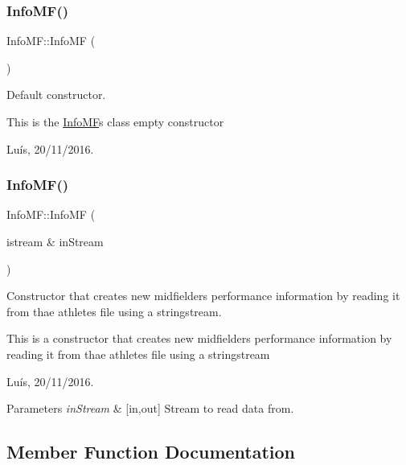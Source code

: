 \subsubsection{\texorpdfstring{Info\+M\+F()}{InfoMF()}\hspace{0.1cm}{\footnotesize\ttfamily [3/4]}}
{\footnotesize\ttfamily Info\+M\+F\+::\+Info\+MF (\begin{DoxyParamCaption}{ }\end{DoxyParamCaption})}



Default constructor. 

This is the \hyperlink{class_info_m_f}{Info\+MF}\textquotesingle{}s class empty constructor

Luís, 20/11/2016. \hypertarget{class_info_m_f_a30dc23356ceb270ca5ca5f7f2a943245}{}\label{class_info_m_f_a30dc23356ceb270ca5ca5f7f2a943245} 
\subsubsection{\texorpdfstring{Info\+M\+F()}{InfoMF()}\hspace{0.1cm}{\footnotesize\ttfamily [4/4]}}
{\footnotesize\ttfamily Info\+M\+F\+::\+Info\+MF (\begin{DoxyParamCaption}\item[{istream \&}]{in\+Stream }\end{DoxyParamCaption})}



Constructor that creates new midfielder\textquotesingle{}s performance information by reading it from thae athletes file using a stringstream. 

This is a constructor that creates new midfielder\textquotesingle{}s performance information by reading it from thae athletes file using a stringstream

Luís, 20/11/2016. 


\begin{DoxyParams}{Parameters}
{\em in\+Stream} & \mbox{[}in,out\mbox{]} Stream to read data from. \\
\hline
\end{DoxyParams}


\subsection{Member Function Documentation}
\hypertarget{class_info_m_f_a9b6f1e8cd28291746e3bf51863e1c7b0}{}\label{class_info_m_f_a9b6f1e8cd28291746e3bf51863e1c7b0} 
